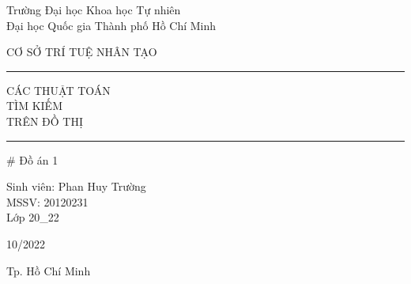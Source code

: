 \documentclass{article}
\begin{document}
 

\begin{titlepage}

    \centering %
    {Trường Đại học Khoa học Tự nhiên \\ Đại học Quốc gia Thành phố Hồ Chí Minh\\}
    
    \vspace*{4\baselineskip} %
	
    {\LARGE CƠ SỞ TRÍ TUỆ NHÂN TẠO\\} %
    \vspace*{5\baselineskip}
    
    \rule{\textwidth}{0.4pt}
    \vspace*{-\baselineskip}
    \vspace*{2pt} %
	
    \vspace*{0.75\baselineskip} %

    {\Huge CÁC THUẬT TOÁN \\ TÌM KIẾM \\ TRÊN ĐỒ THỊ \\}
	
    \vspace{0.75\baselineskip} %
	
    \rule{\textwidth}{0.4pt}
	
    \vspace{1\baselineskip} 

    {\# Đồ án 1\\}
        
    \vspace{2\baselineskip}
    
    {\large Sinh viên: \Large Phan Huy Trường\\}
    \vspace{0.75\baselineskip}
    {\large MSSV: \Large 20120231\\}
    \vspace{0.75\baselineskip}
    {\Large Lớp 20\_22}
	
    \vspace{0.5\baselineskip} %
	
	
    \vfill 
	
	
    10/2022 %
	
    {\large Tp. Hồ Chí Minh} %

\end{titlepage}
\end{document}
